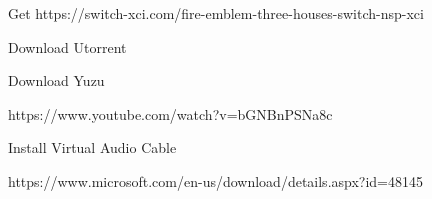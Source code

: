 
Get https://switch-xci.com/fire-emblem-three-houses-switch-nsp-xci

Download Utorrent

Download Yuzu

https://www.youtube.com/watch?v=bGNBnPSNa8c

Install Virtual Audio Cable

https://www.microsoft.com/en-us/download/details.aspx?id=48145
